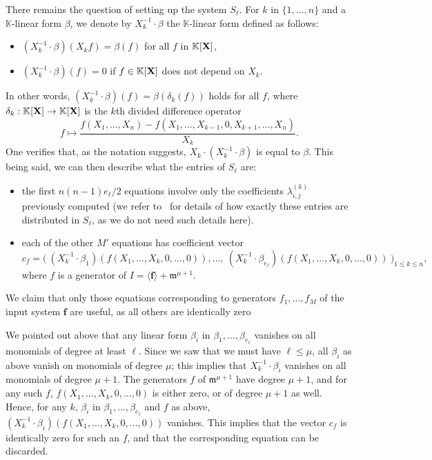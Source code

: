 \documentclass[11pt]{article}
\numberwithin{Property}{section}
\numberwithin{Theorem}{section}
\numberwithin{Proposition}{section}
\numberwithin{Lemma}{section}
\numberwithin{Corollary}{section}
\numberwithin{Definition}{section}
\numberwithin{Remark}{section}
\numberwithin{Conjecture}{section}
\numberwithin{Problem}{section}
\numberwithin{Claim}{section}
\theoremstyle{definition}
\numberwithin{Example}{section}
\def\f {\ensuremath{\mathbf{f}}}
\def\m {\ensuremath{\mathfrak{m}}}
\renewcommand{\le}{\leqslant}
\renewcommand{\le}{\leqslant} %
\newcommand{\field}{\mathbb{K}} %
\newcommand{\mat}[1]{\mathbf{\MakeUppercase{#1}}} %
\begin{document}
There remains the question of setting up the system $S_\ell$. For $k$ in $\{1,\dots,n\}$ and a $\field$-linear form $\beta$, we denote by $X_k^{-1} \cdot \beta$ the $\field$-linear form defined as follows:
\begin{itemize}
\item $(X_k^{-1} \cdot \beta)(X_k f) = \beta(f)$ for all $f$ in $\field[\mat{X}]$,
\item $(X_k^{-1} \cdot \beta)(f)=0$ if $f\in \field[\mat{X}]$ does not depend on $X_k$.
\end{itemize}
In other words, $(X_k^{-1} \cdot \beta)(f)=\beta(\delta_k(f))$ holds for all $f$, where $\delta_k:\field[\mat{X}] \to \field[\mat{X}]$ is the $k$th divided difference operator
\[f \mapsto \frac{f(X_1,\dots,X_n)-f(X_1,\dots,X_{k-1},0,X_{k+1},\dots,X_n)}{X_k}.\]
One verifies that, as the notation suggests, $X_k \cdot (X_k^{-1} \cdot \beta)$ is equal to $\beta$. This being said, we can then describe what the entries of $S_\ell$ are:
\begin{itemize}
\item the first $n(n-1) e_\ell/2$ equations involve only the coefficients $\lambda^{(k)}_{i,j}$ previously computed (we refer to~\cite[Section~4.4]{Mourrain97} for details of how exactly  these entries are distributed in $S_\ell$, as we do not need such details here).
\item each of the other $M'$ equations has coefficient vector
\[c_f = \big (\
 (X_k^{-1} \cdot \beta_1)(f(X_1,\dots,X_k,0,\dots,0)),\dots,\ (X_k^{-1} \cdot \beta_{e_\ell})(f(X_1,\dots,X_k,0,\dots,0))\
\big )_{1 \le k \le n},\]
where $f$ is a generator of $I=\langle \f \rangle +\m^{\mu+1}$.
\end{itemize}
We claim that only those equations corresponding to generators $f_1,\dots,f_M$ of the input system $\f$ are useful, as all others are identically zero 

We pointed out above that any linear form $\beta_i$ in $\beta_1,\dots,\beta_{e_\ell}$ vanishes on all monomials of degree at least $\ell$. Since we saw that we must have $\ell \le \mu$, all $\beta_i$ as above vanish on monomials of degree $\mu$; this implies that $X_k^{-1}\cdot \beta_i$ vanishes on all monomials of degree $\mu+1$. The generators $f$ of $\m^{\mu+1}$ have degree $\mu+1$, and for any such $f$, $f(X_1,\dots,X_k,0,\dots,0)$ is either zero, or of degree $\mu+1$ as well. Hence, for any $k$, $\beta_i$ in $\beta_1,\dots,\beta_{e_\ell}$ and $f$ as above, $(X_k^{-1} \cdot \beta_i)(f(X_1,\dots,X_k,0,\dots,0))$ vanishes. This implies that the vector $c_f$ is identically zero for such an $f$, and that the corresponding equation can be discarded.
\end{document}
